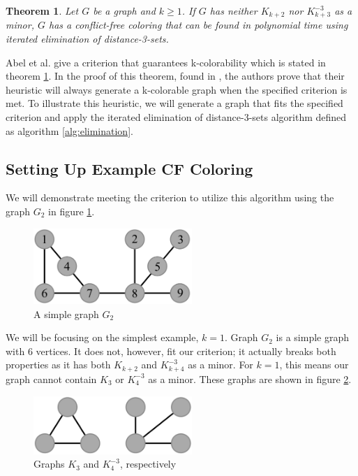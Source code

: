 \documentclass{sig-alternate}
\newtheorem{theorem}{Theorem}
\begin{document}
\begin{theorem} \label{thm:criterion}
Let $G$ be a graph and $k \geq 1$. If $G$ has neither $K_{k+2}$ nor $K_{k+3}^{-3}$ as a minor, $G$ has a conflict-free coloring that can be found in polynomial time using iterated elimination of distance-3-sets.
\end{theorem}

Abel et al. give a criterion that guarantees k-colorability which is stated in theorem \ref{thm:criterion}. In the proof of this theorem, found in \cite{abel2017three}, the authors prove that their heuristic will always generate a k-colorable graph when the specified criterion is met. To illustrate this heuristic, we will generate a graph that fits the specified criterion and apply the iterated elimination of distance-3-sets algorithm defined as algorithm \ref{alg:elimination}.

\subsection{Setting Up Example CF Coloring}
We will demonstrate meeting the criterion to utilize this algorithm using the graph $G_2$ in figure \ref{fig:criterion}.

\begin{figure}[h]
	\centering
	\includegraphics[width=6cm]{../figures/criterion.pdf}
	\caption{A simple graph $G_2$}\label{fig:criterion}
\end{figure}

We will be focusing on the simplest example, $k = 1$. Graph $G_2$ is a simple graph with 6 vertices. It does not, however, fit our criterion; it actually breaks both properties as it has both $K_{k+2}$ and $K_{k+4}^{-3}$ as a minor. For $k = 1$, this means our graph cannot contain $K_{3}$ or $K_{4}^{-3}$ as a minor. These graphs are shown in figure \ref{fig:bad-criterion}.

\begin{figure}[h]
	\centering
	\includegraphics[width=6cm]{../figures/bad-criterion.pdf}
	\caption{Graphs $K_{3}$ and $K_{4}^{-3}$, respectively}\label{fig:bad-criterion}
\end{figure}
\end{document}
